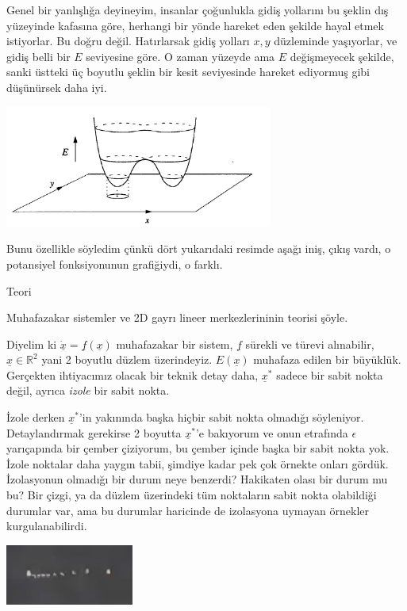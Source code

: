 \documentclass[12pt,fleqn]{article}\usepackage{../../common}
\begin{document}
Genel bir yanlışlığa deyineyim, insanlar çoğunlukla gidiş yollarını bu şeklin
dış yüzeyinde kafasına göre, herhangi bir yönde hareket eden şekilde hayal etmek
istiyorlar. Bu doğru değil. Hatırlarsak gidiş yolları $x,y$ düzleminde
yaşıyorlar, ve gidiş belli bir $E$ seviyesine göre. O zaman yüzeyde ama $E$
değişmeyecek şekilde, sanki üstteki üç boyutlu şeklin bir kesit seviyesinde
hareket ediyormuş gibi düşünürsek daha iyi.

\includegraphics[height=4cm]{07_14.png}

Bunu özellikle söyledim çünkü dört yukarıdaki resimde aşağı iniş, çıkış vardı,
o potansiyel fonksiyonunun grafiğiydi, o farklı.

Teori

Muhafazakar sistemler ve 2D gayrı lineer merkezlerininin teorisi şöyle.

Diyelim ki $\dot{\underline{x}}=\underline{f}(\underline{x})$ muhafazakar bir
sistem, $\underline{f}$ sürekli ve türevi alınabilir, $\underline{x} \in
\mathbb{R}^2$ yani 2 boyutlu düzlem üzerindeyiz. $E(\underline{x})$ muhafaza
edilen bir büyüklük. Gerçekten ihtiyacımız olacak bir teknik detay daha,
$\underline{x}^*$ sadece bir sabit nokta değil, ayrıca {\em izole} bir sabit
nokta.

İzole derken $\underline{x}^*$'in yakınında başka hiçbir sabit nokta olmadığı
söyleniyor. Detaylandırmak gerekirse 2 boyutta $\underline{x}^*$'e bakıyorum ve
onun etrafında $\epsilon$ yarıçapında bir çember çiziyorum, bu çember içinde
başka bir sabit nokta yok. İzole noktalar daha yaygın tabii, şimdiye kadar pek
çok örnekte onları gördük. İzolasyonun olmadığı bir durum neye benzerdi?
Hakikaten olası bir durum mu bu? Bir çizgi, ya da düzlem üzerindeki tüm
noktaların sabit nokta olabildiği durumlar var, ama bu durumlar haricinde de
izolasyona uymayan örnekler kurgulanabilirdi.

\includegraphics[height=2cm]{07_15.png}
\end{document}
